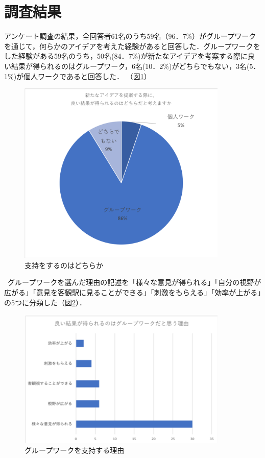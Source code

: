 \documentclass{funthesis}
\begin{document}
\section{調査結果}

アンケート調査の結果，全回答者61名のうち59名（96．7\%）がグループワークを通じて，何らかのアイデアを考えた経験があると回答した．グループワークをした経験がある59名のうち，50名(84．7\%)が新たなアイデアを考案する際に良い結果が得られるのはグループワーク，6名(10．2\%)がどちらでもない，3名(5．1\%)が個人ワークであると回答した．
（図\ref{graph0}）
\begin{figure}[h]
 \centering
   \includegraphics[width=100mm]{figures/en1.png}
 \caption{支持をするのはどちらか}
 \label{graph0}
\end{figure}

\ グループワークを選んだ理由の記述を「様々な意見が得られる」「自分の視野が広がる」「意見を客観駅に見ることができる」「刺激をもらえる」「効率が上がる」の5つに分類した（図\ref{graph1}）．
\begin{figure}[h]
 \centering
   \includegraphics[width=100mm]{figures/graph1.png}
 \caption{グループワークを支持する理由}
 \label{graph1}
\end{figure}
\end{document}
